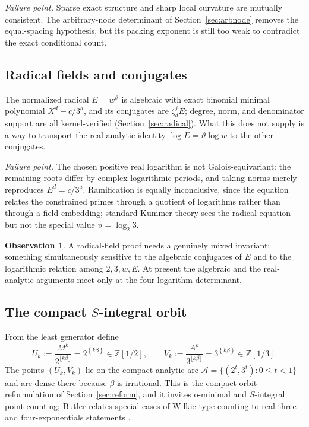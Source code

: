 \documentclass[11pt,oneside]{article}
\theoremstyle{definition}
\newtheorem{observation}[theorem]{Observation}
\theoremstyle{remark}
\newcommand{\Z}{\mathbb Z}
\newcommand{\thetaq}{\vartheta}
\newcommand{\fract}[1]{\left\{#1\right\}}
\begin{document}
\emph{Failure point.}  Sparse exact structure and sharp local curvature are mutually
consistent.  The arbitrary-node determinant of Section~\ref{sec:arbnode} removes the
equal-spacing hypothesis, but its packing exponent is still too weak to contradict the exact
conditional count.

\subsection{Radical fields and conjugates}
\label{at:radical}

The normalized radical $E=w^{\thetaq}$ is algebraic with exact binomial minimal polynomial
$X^{d}-c/3^{a}$, and its conjugates are $\zeta_d^{j}E$; degree, norm, and denominator
support are all kernel-verified (Section~\ref{sec:radical}).  What this does not supply is a
way to transport the real analytic identity $\log E=\thetaq\log w$ to the other conjugates.

\emph{Failure point.}  The chosen positive real logarithm is not Galois-equivariant: the
remaining roots differ by complex logarithmic periods, and taking norms merely reproduces
$E^{d}=c/3^{a}$.  Ramification is equally inconclusive, since the equation relates the
constrained primes through a quotient of logarithms rather than through a field embedding;
standard Kummer theory sees the radical equation but not the special value
$\thetaq=\log_2 3$.

\begin{observation}
\label{at:obs-radical}
A radical-field proof needs a genuinely mixed invariant: something simultaneously sensitive
to the algebraic conjugates of $E$ and to the logarithmic relation among $2,3,w,E$.  At
present the algebraic and the real-analytic arguments meet only at the four-logarithm
determinant.
\end{observation}

\subsection{The compact \texorpdfstring{$S$}{S}-integral orbit}
\label{at:orbit}

From the least generator define
\[
  U_k:=\frac{M^{k}}{2^{\lfloor k\beta\rfloor}}=2^{\fract{k\beta}}\in\Z[1/2],
  \qquad
  V_k:=\frac{A^{k}}{3^{\lfloor k\beta\rfloor}}=3^{\fract{k\beta}}\in\Z[1/3].
\]
The points $(U_k,V_k)$ lie on the compact analytic arc
$\mathcal A=\{(2^{t},3^{t}):0\le t<1\}$ and are dense there because $\beta$ is irrational.
This is the compact-orbit reformulation of Section~\ref{sec:reform}, and it invites
o-minimal and $S$-integral point counting; Butler relates special cases of Wilkie-type
counting to real three- and four-exponentials statements \cite{Butler2017}.
\end{document}
